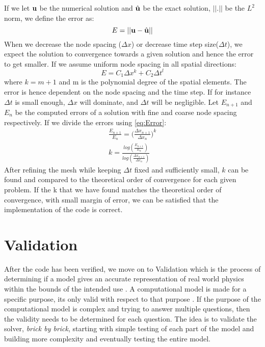 If we let $\bold{u}$ be the numerical solution and $\hat{\bold{u}}$ be the exact solution, $|| . ||$ be the $L^2$ norm, we define the error as:
\begin{equation}
E = || \bold{u} - \hat{\bold{u}} ||
\end{equation}
When we decrease the node spacing ($ \Delta x $) or decrease time step size($\Delta t$), we expect the solution to convergence towards a given solution and hence the error to get smaller. If we assume uniform node spacing in all spatial directions: 
\begin{equation}
\label{eq:Error}
 E = C_1 \Delta x^k+ C_2 \Delta t^l 
\end{equation}
where $ k = m+1 $ and m is the polynomial degree of the spatial elements. The error is hence dependent on the node spacing and the time step.
If for instance $\Delta t$ is small enough, $\Delta x$ will dominate, and $\Delta t$ will be negligible. 
Let $E_{n+1}$ and $E_{n}$ be the computed errors of a solution with fine and coarse node spacing respectively.
If we divide the errors using \eqref{eq:Error}:
\begin{align}
\frac{E_{n+1}}{E_n} = \big( \frac{\Delta x_{n+1}}{\Delta x_n} \big)^k \\
k = \frac{log( \frac{E_{n+1}}{E_n}) }{ log(\frac{\Delta x_{n+1}}{\Delta x_n})}
\end{align}
After refining the mesh while keeping $\Delta t $ fixed and sufficiently small,
$k$ can be found and compared to the theoretical order of convergence for each given problem. If the k that we have found matches the theoretical order of convergence, with small margin of error, we can be satisfied that the implementation of the code is correct. \newline




\section{Validation}
After the code has been verified, we move on to Validation which is the process of determining if a model gives an accurate representation of real world physics within the bounds of the intended use \cite{oberkampf2008verification}. A computational model is made for a specific purpose, its only valid with respect to that purpose \cite{Macal2005}. If the purpose of the computational model is complex and trying to answer multiple questions, then the validity needs to be determined for each question. The idea is to validate the solver, \textsl{brick by brick}, starting with simple testing of each part of the model and building more complexity and eventually testing the entire model.\newline

